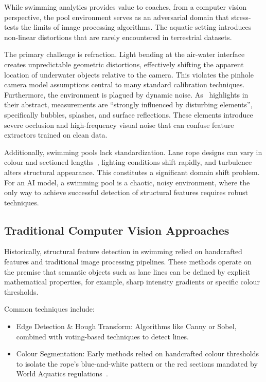 \documentclass[conference]{IEEEtran}
\begin{document}
While swimming analytics provides value to coaches, from a computer vision perspective, the pool environment serves as an adversarial domain that stress-tests the limits of image processing algorithms. The aquatic setting introduces non-linear distortions that are rarely encountered in terrestrial datasets.

The primary challenge is refraction. Light bending at the air-water interface creates unpredictable geometric distortions, effectively shifting the apparent location of underwater objects relative to the camera. This violates the pinhole camera model assumptions central to many standard calibration techniques. Furthermore, the environment is plagued by dynamic noise. As~\cite{giulietti2023} highlights in their abstract, measurements are ``strongly influenced by disturbing elements'', specifically bubbles, splashes, and surface reflections. These elements introduce severe occlusion and high-frequency visual noise that can confuse feature extractors trained on clean data.

Additionally, swimming pools lack standardization. Lane rope designs can vary in colour and sectioned lengths~\cite{FINA2025}, lighting conditions shift rapidly, and turbulence alters structural appearance. This constitutes a significant domain shift problem. For an AI model, a swimming pool is a chaotic, noisy environment, where the only way to achieve successful detection of structural features requires robust techniques.

\subsection{Traditional Computer Vision Approaches}

Historically, structural feature detection in swimming relied on handcrafted features and traditional image processing pipelines. These methods operate on the premise that semantic objects such as lane lines can be defined by explicit mathematical properties, for example, sharp intensity gradients or specific colour thresholds.

Common techniques include:
\begin{itemize}
    \item Edge Detection \& Hough Transform: Algorithms like Canny or Sobel, combined with voting-based techniques to detect lines.
    \item Colour Segmentation: Early methods relied on handcrafted colour thresholds to isolate the rope's blue-and-white pattern or the red sections mandated by World Aquatics regulations~\cite{FINA2025}.
\end{itemize}
\end{document}
